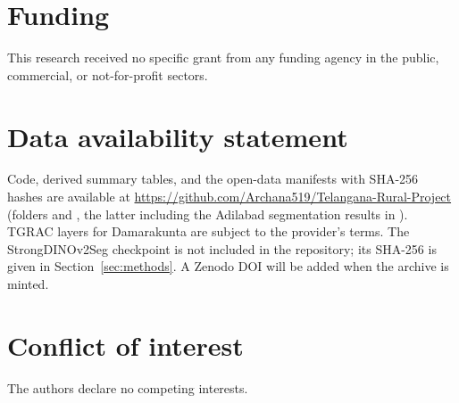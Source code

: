 \documentclass[12pt,a4paper]{article}
\newif\ifanon
\newcommand{\dinoseg}{StrongDINOv2Seg}
\begin{document}
\section*{Funding}
This research received no specific grant from any funding agency in the public, commercial, or not-for-profit sectors.

\section*{Data availability statement}
\ifanon
Code, derived tables and the open-data manifests (with SHA-256 hashes) will be made available in a public repository on acceptance and are available to reviewers on request. TGRAC layers for Damarakunta are subject to the provider's terms.
\else
Code, derived summary tables, and the open-data manifests with SHA-256 hashes are available at \url{https://github.com/Archana519/Telangana-Rural-Project} (folders  and , the latter including the Adilabad segmentation results in ). TGRAC layers for Damarakunta are subject to the provider's terms. The \dinoseg{} checkpoint is not included in the repository; its SHA-256 is given in Section~\ref{sec:methods}. A Zenodo DOI will be added when the archive is minted.
\fi

\section*{Conflict of interest}
The authors declare no competing interests.



\end{document}
